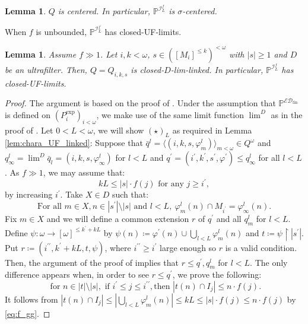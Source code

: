 \documentclass[a4paper,12pt]{amsart}
\newtheorem{lem}[thm]{Lemma}
\theoremstyle{definition}
\numberwithin{thm}{section}
\numberwithin{equation}{section}
\newcommand{\on}{\mathpunct{\upharpoonright}}
\newcommand{\I}{\mathscr{I}}
\newcommand{\dif}{\mathbb{P}^{\I_L^f}}
\newcommand{\edfin}{\mathcal{ED}_\mathrm{fin}}
\newcommand{\posetEDfin}{\mathbb{P}^{\edfin}}
\begin{document}
    \begin{lem}\label{lem:DI_sigma_centered}
    	$Q$ is centered. In particular, $\dif$ is $\sigma$-centered.
    \end{lem}
    
    When $f$ is unbounded, $\dif$ has closed-UF-limits.
    
    \begin{lem}
    	\label{lem:DI_has_UF-limits}
        Assume $f\gg1$. Let $i,k<\omega$, $s\in([M_i]^{\leq k})^{<\omega}$ with $|s|\geq 1$ and $D$ be an ultrafilter. Then, $Q=Q_{i,k,s}$ is closed-$D$-lim-linked. In particular, $\dif$ has closed-UF-limits.
    \end{lem}
    \begin{proof}
        The argument is based on the proof of . 
        Under the assumption that $\posetEDfin$ is defined on $(P_i^\mathrm{exp})_{i<\omega}$, we make use of the same limit function $\lim^D$ as in the proof of . 
    	Let $0<L<\omega$, we will show $(\star)_L$ as required in Lemma \ref{lem:chara_UF_linked}: Suppose that  $\bar{q}^l=\langle(i,k,s,\varphi_m^l)\rangle_{m<\omega}\in Q^\omega$ and $q_\infty^l=\lim^D\bar{q}_l=(i,k,s,\varphi_\infty^l)$ for $l<L$ and $q^\prime=(i^\prime,k^\prime,s^\prime,\varphi^\prime)\leq q_\infty^l$ for all $l<L$.
    	As $f\gg1$, we may assume that: 
        \begin{equation}
        \label{eq:f_gg}
            kL\leq |s|\cdot f(j)\text{ for any }j\geq i^\prime,
        \end{equation}
        by increasing $i^\prime$.
        Take $X\in D$ such that:
    	\begin{equation}
    		\text{For all }m\in X, n\in|s^\prime|\setminus|s|\text{ and }l<L, ~\varphi_m^l(n)\cap  M_{i^\prime}=\varphi_\infty^l(n).
    	\end{equation}
    	Fix $m\in X$ and we will define a common extension $r$ of $q^\prime$ and all $q^l_m$ for $l<L$. Define $\psi\colon\omega\to [\omega]^{\leq k^\prime+kL}$ by $\psi(n)\coloneq\varphi^\prime(n)\cup\bigcup_{l<L}\varphi^l_m(n)$ and $t\coloneq\psi\on|s^\prime|$. Put $r\coloneq(i^{\prime\prime},k^\prime+kL,t,\psi)$, where $i^{\prime\prime}\geq i^\prime$ large enough so $r$ is a valid condition. 
        Then, the argument of the proof of  implies that $r\leq q^\prime,q^l_m$ for $l<L$.
        The only difference appears when, in order to see $r\leq q^\prime$, we prove the following:
        \[\text{ for }n\in |t|\setminus|s|,\text{ if }i^\prime\leq j\leq i^{\prime\prime}, \text{then }|t(n)\cap I_j|\leq n \cdot f(j).\]
    	It follows from $|t(n)\cap I_j|\leq|\bigcup_{l<L}\varphi^l_m(n)|\leq kL\leq |s|\cdot f(j)\leq n \cdot f(j)$ by \eqref{eq:f_gg}.
    \end{proof}
    
\end{document}
